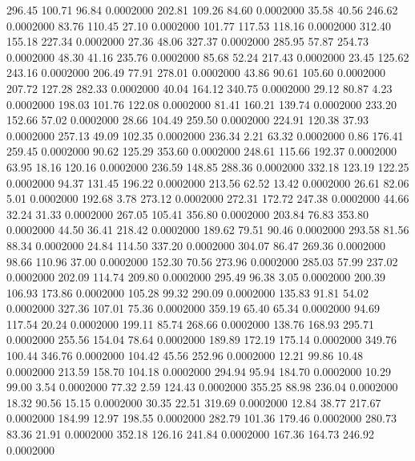  296.45  100.71   96.84   0.0002000
 202.81  109.26   84.60   0.0002000
  35.58   40.56  246.62   0.0002000
  83.76  110.45   27.10   0.0002000
 101.77  117.53  118.16   0.0002000
 312.40  155.18  227.34   0.0002000
  27.36   48.06  327.37   0.0002000
 285.95   57.87  254.73   0.0002000
  48.30   41.16  235.76   0.0002000
  85.68   52.24  217.43   0.0002000
  23.45  125.62  243.16   0.0002000
 206.49   77.91  278.01   0.0002000
  43.86   90.61  105.60   0.0002000
 207.72  127.28  282.33   0.0002000
  40.04  164.12  340.75   0.0002000
  29.12   80.87    4.23   0.0002000
 198.03  101.76  122.08   0.0002000
  81.41  160.21  139.74   0.0002000
 233.20  152.66   57.02   0.0002000
  28.66  104.49  259.50   0.0002000
 224.91  120.38   37.93   0.0002000
 257.13   49.09  102.35   0.0002000
 236.34    2.21   63.32   0.0002000
   0.86  176.41  259.45   0.0002000
  90.62  125.29  353.60   0.0002000
 248.61  115.66  192.37   0.0002000
  63.95   18.16  120.16   0.0002000
 236.59  148.85  288.36   0.0002000
 332.18  123.19  122.25   0.0002000
  94.37  131.45  196.22   0.0002000
 213.56   62.52   13.42   0.0002000
  26.61   82.06    5.01   0.0002000
 192.68    3.78  273.12   0.0002000
 272.31  172.72  247.38   0.0002000
  44.66   32.24   31.33   0.0002000
 267.05  105.41  356.80   0.0002000
 203.84   76.83  353.80   0.0002000
  44.50   36.41  218.42   0.0002000
 189.62   79.51   90.46   0.0002000
 293.58   81.56   88.34   0.0002000
  24.84  114.50  337.20   0.0002000
 304.07   86.47  269.36   0.0002000
  98.66  110.96   37.00   0.0002000
 152.30   70.56  273.96   0.0002000
 285.03   57.99  237.02   0.0002000
 202.09  114.74  209.80   0.0002000
 295.49   96.38    3.05   0.0002000
 200.39  106.93  173.86   0.0002000
 105.28   99.32  290.09   0.0002000
 135.83   91.81   54.02   0.0002000
 327.36  107.01   75.36   0.0002000
 359.19   65.40   65.34   0.0002000
  94.69  117.54   20.24   0.0002000
 199.11   85.74  268.66   0.0002000
 138.76  168.93  295.71   0.0002000
 255.56  154.04   78.64   0.0002000
 189.89  172.19  175.14   0.0002000
 349.76  100.44  346.76   0.0002000
 104.42   45.56  252.96   0.0002000
  12.21   99.86   10.48   0.0002000
 213.59  158.70  104.18   0.0002000
 294.94   95.94  184.70   0.0002000
  10.29   99.00    3.54   0.0002000
  77.32    2.59  124.43   0.0002000
 355.25   88.98  236.04   0.0002000
  18.32   90.56   15.15   0.0002000
  30.35   22.51  319.69   0.0002000
  12.84   38.77  217.67   0.0002000
 184.99   12.97  198.55   0.0002000
 282.79  101.36  179.46   0.0002000
 280.73   83.36   21.91   0.0002000
 352.18  126.16  241.84   0.0002000
 167.36  164.73  246.92   0.0002000
